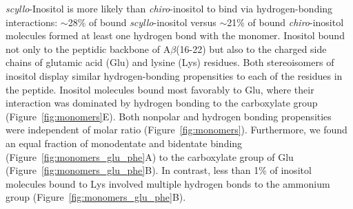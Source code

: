 \emph{scyllo}-Inositol is more likely than \emph{chiro}-inositol to bind via hydrogen-bonding interactions: $\sim$28\% of bound \emph{scyllo}-inositol versus $\sim$21\% of bound \emph{chiro}-inositol molecules formed at least one hydrogen bond with the monomer. Inositol bound not only to the peptidic backbone of A$\beta$(16-22) but also to the charged side chains of glutamic acid (Glu) and lysine (Lys) residues. Both stereoisomers of inositol display similar hydrogen-bonding propensities to each of the residues in the peptide. %
Inositol molecules bound most favorably to Glu, where their interaction was dominated by hydrogen bonding to the carboxylate group (Figure~\ref{fig:monomers}E). Both nonpolar and hydrogen bonding propensities were independent of molar ratio (Figure~{\ref{fig:monomers}}). 
Furthermore, we found an equal fraction of monodentate and bidentate binding (Figure~\ref{fig:monomers_glu_phe}A) to the carboxylate group of Glu (Figure~\ref{fig:monomers_glu_phe}B). In contrast, less than 1\% of inositol molecules bound to Lys involved multiple hydrogen bonds to the ammonium group (Figure~\ref{fig:monomers_glu_phe}B).

